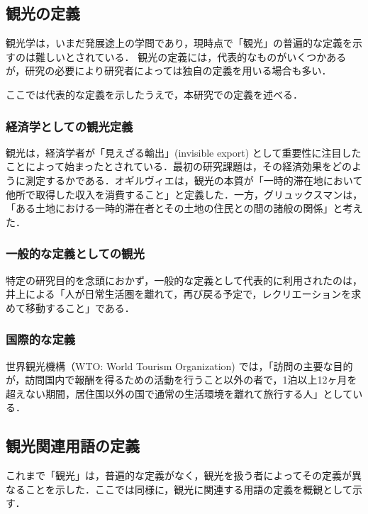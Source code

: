 \documentclass{jsarticle}
\begin{document}
\subsection{観光の定義}

\label{definition_of_tourism}

観光学は，いまだ発展途上の学問であり，現時点で「観光」の普遍的な定義を示すのは難しいとされている\cite{kanko_define}．
観光の定義には，代表的なものがいくつかあるが，研究の必要により研究者によっては独自の定義を用いる場合も多い．

ここでは代表的な定義を示したうえで，本研究での定義を述べる．


\subsubsection{経済学としての観光定義}

観光は，経済学者が「見えざる輸出」(invisible export) として重要性に注目したことによって始まったとされている\cite{kanko_define}．最初の研究課題は，その経済効果をどのように測定するかである．オギルヴィエは，観光の本質が「一時的滞在地において他所で取得した収入を消費すること」と定義した\cite{tourism_economy1}．一方，グリュックスマンは，「ある土地における一時的滞在者とその土地の住民との間の諸般の関係\cite{tourism_economy2}」と考えた．

\subsubsection{一般的な定義としての観光}

特定の研究目的を念頭におかず，一般的な定義として代表的に利用されたのは，井上による「人が日常生活圏を離れて，再び戻る予定で，レクリエーションを求めて移動すること」である\cite{inoue}．

\subsubsection{国際的な定義}

世界観光機構（WTO: World Tourism Organization) では，「訪問の主要な目的が，訪問国内で報酬を得るための活動を行うこと以外の者で，1泊以上12ヶ月を超えない期間，居住国以外の国で通常の生活環境を離れて旅行する人」としている\cite{wto}．

\subsection{観光関連用語の定義}

これまで「観光」は，普遍的な定義がなく，観光を扱う者によってその定義が異なることを示した．ここでは同様に，観光に関連する用語の定義を概観として示す．
\end{document}

